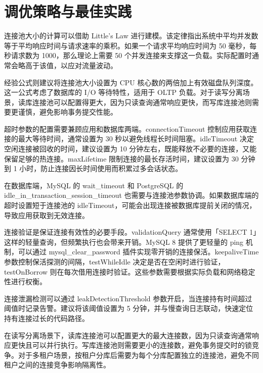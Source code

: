 \chapter{调优策略与最佳实践}
连接池大小的计算可以借助 Little’s Law 进行建模。该定律指出系统中平均并发数等于平均响应时间与请求速率的乘积。如果一个请求平均响应时间为 50 毫秒，每秒请求数为 1000，那么理论上需要 50 个并发连接来支撑这一负载。实际配置时通常会略高于该值，以应对流量波动。\par
经验公式则建议将连接池大小设置为 CPU 核心数的两倍加上有效磁盘队列深度。这一公式考虑了数据库的 I/O 等待特性，适用于 OLTP 负载。对于读写分离场景，读库连接池可以配置得更大，因为只读查询通常响应更快，而写库连接池则需要更谨慎，避免影响事务提交性能。\par
超时参数的配置需要兼顾应用和数据库两端。connectionTimeout 控制应用获取连接的最大等待时间，通常设置为 30 秒以避免线程长时间阻塞。idleTimeout 决定空闲连接被回收的时间，建议设置为 10 分钟左右，既能释放不必要的连接，又能保留足够的热连接。maxLifetime 限制连接的最长存活时间，建议设置为 30 分钟到 1 小时，防止连接因长时间使用而积累过多会话状态。\par
在数据库端，MySQL 的 wait\_{}timeout 和 PostgreSQL 的 idle\_{}in\_{}transaction\_{}session\_{}timeout 也需要与连接池参数协调。如果数据库端的超时设置短于连接池的 idleTimeout，可能会出现连接被数据库提前关闭的情况，导致应用获取到无效连接。\par
连接验证是保证连接有效性的必要手段。validationQuery 通常使用「SELECT 1」这样的轻量查询，但频繁执行也会带来开销。MySQL 8 提供了更轻量的 ping 机制，可以通过 mysql\_{}clear\_{}password 插件实现零开销的连接保活。keepaliveTime 参数控制保活探测的间隔，testWhileIdle 决定是否在空闲时进行验证，testOnBorrow 则在每次借用连接时验证。这些参数需要根据实际负载和网络稳定性进行权衡。\par
连接泄漏检测可以通过 leakDetectionThreshold 参数开启，当连接持有时间超过阈值时记录告警。建议将该阈值设置为 5 分钟，并与慢查询日志联动，快速定位持有连接过长的代码路径。\par
在读写分离场景下，读库连接池可以配置更大的最大连接数，因为只读查询通常响应更快且可以并行执行。写库连接池则需要更小的连接数，避免事务提交时的锁竞争。对于多租户场景，按租户分库后需要为每个分库配置独立的连接池，避免不同租户之间的连接竞争影响隔离性。\par

